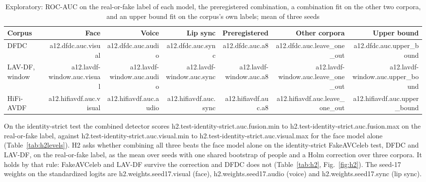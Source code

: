 \documentclass[conference]{IEEEtran}
\begin{document}
\begin{table}[htbp]
\caption{Exploratory: ROC-AUC on the real-or-fake label of each model, the
preregistered combination, a combination fit on the other two corpora, and an
upper bound fit on the corpus's own labels; mean of three seeds}
\label{tab:a12}
\centering
\begin{tabular}{lrrrrrr}
\toprule
Corpus & Face & Voice & Lip sync & Preregistered & Other corpora & Upper bound \\
\midrule
DFDC & {{a12.dfdc.auc.visual}} & {{a12.dfdc.auc.audio}} & {{a12.dfdc.auc.sync}} & {{a12.dfdc.auc.a8}} & {{a12.dfdc.auc.leave_one_out}} & {{a12.dfdc.auc.upper_bound}} \\
LAV-DF, window & {{a12.lavdf-window.auc.visual}} & {{a12.lavdf-window.auc.audio}} & {{a12.lavdf-window.auc.sync}} & {{a12.lavdf-window.auc.a8}} & {{a12.lavdf-window.auc.leave_one_out}} & {{a12.lavdf-window.auc.upper_bound}} \\
HiFi-AVDF & {{a12.hifiavdf.auc.visual}} & {{a12.hifiavdf.auc.audio}} & {{a12.hifiavdf.auc.sync}} & {{a12.hifiavdf.auc.a8}} & {{a12.hifiavdf.auc.leave_one_out}} & {{a12.hifiavdf.auc.upper_bound}} \\
\bottomrule
\end{tabular}
\end{table}

On the identity-strict test the combined detector scores
{{h2.test-identity-strict.auc.fusion.min}} to
{{h2.test-identity-strict.auc.fusion.max}} on the real-or-fake label, against
{{h2.test-identity-strict.auc.visual.min}} to
{{h2.test-identity-strict.auc.visual.max}} for the face model alone
(Table~\ref{tab:h2levels}). H2 asks whether combining all three beats the face model alone on the identity-strict FakeAVCeleb test, DFDC and
LAV-DF, on the real-or-fake label, as the mean over seeds with
one shared bootstrap of people and a Holm correction over three corpora. It
holds by that rule: FakeAVCeleb and LAV-DF survive the correction and DFDC does
not (Table~\ref{tab:h2}, Fig.~\ref{fig:h2}). The seed-17 weights on the
standardized logits are {{h2.weights.seed17.visual}} (face),
{{h2.weights.seed17.audio}} (voice) and {{h2.weights.seed17.sync}} (lip sync).
\end{document}
